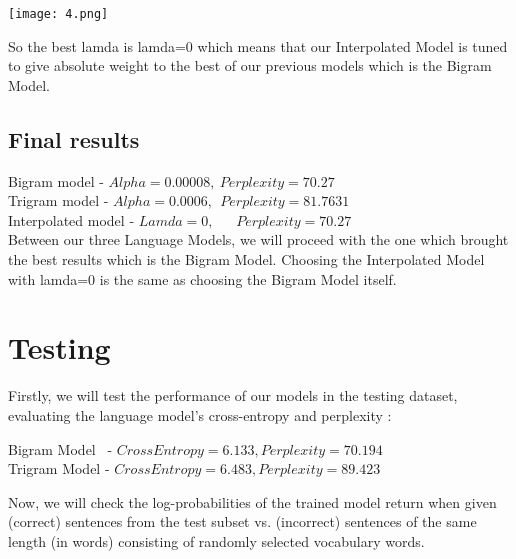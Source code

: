 \documentclass[12pt]{article}
\begin{document}
\vspace{1cm}

\texttt{[image: 4.png]}

\vspace{1cm}

So the best lamda is lamda=0 which means that our Interpolated Model is tuned to give
absolute weight to the best of our previous models which is the Bigram Model.

\subsection{Final results}

Bigram model \hspace{1cm}- $Alpha=0.00008, \ Perplexity = 70.27$ \\
Trigram model \hspace{0.7cm} - $Alpha =0.0006, \ \ Perplexity = 81.7631$ \\
Interpolated model - $Lamda =0, \ \ \ \ \ \ \ Perplexity = 70.27$ \\

Between our three Language Models, we will proceed with the one which brought the best
results which is the Bigram Model.
Choosing the Interpolated Model with lamda=0 is the same as choosing the Bigram Model
itself.

\newpage

\section{Testing}

Firstly, we will test the performance of our models in the testing dataset, evaluating the language
model’s cross-entropy and perplexity :

\vspace{0.5cm}

Bigram Model  \ - $Cross Entropy= 6.133, Perplexity= 70.194$ \\
Trigram Model - $Cross Entropy= 6.483, Perplexity= 89.423$

\vspace{0.5cm}

Now, we will check the log-probabilities of the trained model return when given (correct) sentences
from the test subset vs. (incorrect) sentences of the same length (in words) consisting of randomly
selected vocabulary words.

\vspace{0.5cm}
\end{document}
